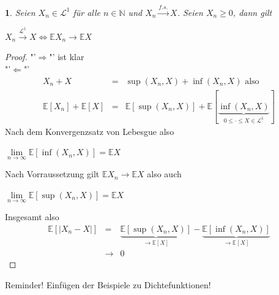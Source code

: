 \documentclass[10pt,a4paper]{report}
\newcommand{\E}{\mathbb{E}}
\newcommand{\N}{\mathbb{N}}
\numberwithin{equation}{section}
\numberwithin{figure}{section}
\theoremstyle{plain}
\theoremstyle{definition}
\theoremstyle{remark}
\theoremstyle{plain}
\newtheorem{prop}[thm]{\protect\propositionname}
\providecommand{\propositionname}{Satz}
\newcommand{\1}{ \mathbb{1} } %
\begin{document}
\begin{prop}  %
  Seien $X_n \in \mathcal{L}^1$ für alle $n \in \N$ und $X_n
  \overset{f.s.}{\to} X$. Seien $X_n\geq 0$, dann gilt
  \begin{center}
    $X_n \overset{\mathcal{L}^1}{\to} X \Leftrightarrow \E X_n \to \E
    X$
  \end{center}
\end{prop}
\begin{proof} 
  "'$\Rightarrow$"' ist klar\\
  "'$\Leftarrow$"'
  \begin{eqnarray*}
    X_n+X &=& \sup(X_n,X)+\inf(X_n,X) \text{ also }\\
    \E[X_n]+\E[X] &=& \E[\sup(X_n,X)]+\E[\underbrace{\inf(X_n,X)}_{0 \leq \cdot \leq X \in \mathcal{L}^1}]
  \end{eqnarray*}
  Nach dem Konvergenzsatz von Lebesgue also
  \begin{center}
    $\lim\limits_{n \to \infty} \E[\inf(X_n,X)]=\E X$
  \end{center}
  Nach Vorraussetzung gilt $\E X_n \to \E X$ also auch
  \begin{center}
    $\lim\limits_{n \to \infty} \E[\sup(X_n,X)]=\E X$
  \end{center}
  Insgesamt also
  \begin{eqnarray*}
    \E[|X_n-X|] &=&\underbrace{\E[\sup(X_n,X)]}_{\to \E[X]}-\underbrace{\E[\inf(X_n,X)]}_{\to \E[X]}\\
    & \to & 0 
  \end{eqnarray*}
\end{proof}
Reminder! Einfügen der Beispiele zu Dichtefunktionen!
\end{document}
